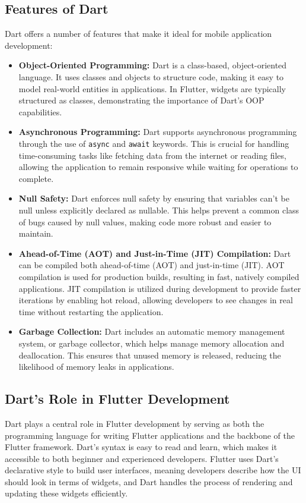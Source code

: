 \documentclass[12pt,a4paper]{report}
\begin{document}
\subsection{Features of Dart}
Dart offers a number of features that make it ideal for mobile application development:
\begin{itemize}
    \item \textbf{Object-Oriented Programming:} Dart is a class-based, object-oriented language. It uses classes and objects to structure code, making it easy to model real-world entities in applications. In Flutter, widgets are typically structured as classes, demonstrating the importance of Dart’s OOP capabilities.
    
    \item \textbf{Asynchronous Programming:} Dart supports asynchronous programming through the use of \texttt{async} and \texttt{await} keywords. This is crucial for handling time-consuming tasks like fetching data from the internet or reading files, allowing the application to remain responsive while waiting for operations to complete.
    
    \item \textbf{Null Safety:} Dart enforces null safety by ensuring that variables can’t be null unless explicitly declared as nullable. This helps prevent a common class of bugs caused by null values, making code more robust and easier to maintain.
    
    \item \textbf{Ahead-of-Time (AOT) and Just-in-Time (JIT) Compilation:} Dart can be compiled both ahead-of-time (AOT) and just-in-time (JIT). AOT compilation is used for production builds, resulting in fast, natively compiled applications. JIT compilation is utilized during development to provide faster iterations by enabling hot reload, allowing developers to see changes in real time without restarting the application.
    
    \item \textbf{Garbage Collection:} Dart includes an automatic memory management system, or garbage collector, which helps manage memory allocation and deallocation. This ensures that unused memory is released, reducing the likelihood of memory leaks in applications.
\end{itemize}

\subsection{Dart’s Role in Flutter Development}
Dart plays a central role in Flutter development by serving as both the programming language for writing Flutter applications and the backbone of the Flutter framework. Dart’s syntax is easy to read and learn, which makes it accessible to both beginner and experienced developers. Flutter uses Dart’s declarative style to build user interfaces, meaning developers describe how the UI should look in terms of widgets, and Dart handles the process of rendering and updating these widgets efficiently.
\end{document}
